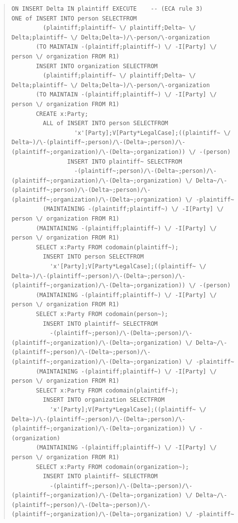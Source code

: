 \documentclass[10pt,a4paper]{report}              %
\theoremstyle{plain}\theorembodyfont{\rmfamily}\newtheorem{definition}{Definition}[section]
\theoremstyle{plain}\theorembodyfont{\rmfamily}\newtheorem{designrule}[definition]{Requirement}
\begin{document}
\begin{quote}
\begin{verbatim}
ON INSERT Delta IN plaintiff EXECUTE    -- (ECA rule 3)
ONE of INSERT INTO person SELECTFROM
         (plaintiff;plaintiff~ \/ plaintiff;Delta~ \/ Delta;plaintiff~ \/ Delta;Delta~)/\-person/\-organization
       (TO MAINTAIN -(plaintiff;plaintiff~) \/ -I[Party] \/ person \/ organization FROM R1)
       INSERT INTO organization SELECTFROM
         (plaintiff;plaintiff~ \/ plaintiff;Delta~ \/ Delta;plaintiff~ \/ Delta;Delta~)/\-person/\-organization
       (TO MAINTAIN -(plaintiff;plaintiff~) \/ -I[Party] \/ person \/ organization FROM R1)
       CREATE x:Party;
         ALL of INSERT INTO person SELECTFROM
                  'x'[Party];V[Party*LegalCase];((plaintiff~ \/ Delta~)/\-(plaintiff~;person)/\-(Delta~;person)/\-(plaintiff~;organization)/\-(Delta~;organization)) \/ -(person)
                INSERT INTO plaintiff~ SELECTFROM
                  -(plaintiff~;person)/\-(Delta~;person)/\-(plaintiff~;organization)/\-(Delta~;organization) \/ Delta~/\-(plaintiff~;person)/\-(Delta~;person)/\-(plaintiff~;organization)/\-(Delta~;organization) \/ -plaintiff~
         (MAINTAINING -(plaintiff;plaintiff~) \/ -I[Party] \/ person \/ organization FROM R1)
       (MAINTAINING -(plaintiff;plaintiff~) \/ -I[Party] \/ person \/ organization FROM R1)
       SELECT x:Party FROM codomain(plaintiff~);
         INSERT INTO person SELECTFROM
           'x'[Party];V[Party*LegalCase];((plaintiff~ \/ Delta~)/\-(plaintiff~;person)/\-(Delta~;person)/\-(plaintiff~;organization)/\-(Delta~;organization)) \/ -(person)
       (MAINTAINING -(plaintiff;plaintiff~) \/ -I[Party] \/ person \/ organization FROM R1)
       SELECT x:Party FROM codomain(person~);
         INSERT INTO plaintiff~ SELECTFROM
           -(plaintiff~;person)/\-(Delta~;person)/\-(plaintiff~;organization)/\-(Delta~;organization) \/ Delta~/\-(plaintiff~;person)/\-(Delta~;person)/\-(plaintiff~;organization)/\-(Delta~;organization) \/ -plaintiff~
       (MAINTAINING -(plaintiff;plaintiff~) \/ -I[Party] \/ person \/ organization FROM R1)
       SELECT x:Party FROM codomain(plaintiff~);
         INSERT INTO organization SELECTFROM
           'x'[Party];V[Party*LegalCase];((plaintiff~ \/ Delta~)/\-(plaintiff~;person)/\-(Delta~;person)/\-(plaintiff~;organization)/\-(Delta~;organization)) \/ -(organization)
       (MAINTAINING -(plaintiff;plaintiff~) \/ -I[Party] \/ person \/ organization FROM R1)
       SELECT x:Party FROM codomain(organization~);
         INSERT INTO plaintiff~ SELECTFROM
           -(plaintiff~;person)/\-(Delta~;person)/\-(plaintiff~;organization)/\-(Delta~;organization) \/ Delta~/\-(plaintiff~;person)/\-(Delta~;person)/\-(plaintiff~;organization)/\-(Delta~;organization) \/ -plaintiff~

\end{verbatim}
\end{quote}
\end{document}

